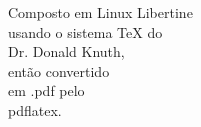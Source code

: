 \vspace*{\fill}
	\begin{flushright}
	{\large 
	Composto em Linux Libertine \\
	usando o sistema \TeX{} do \\
	Dr. Donald Knuth, \\
	então convertido \\
	em .pdf pelo \\
	pdflatex. \\}
	\end{flushright}
